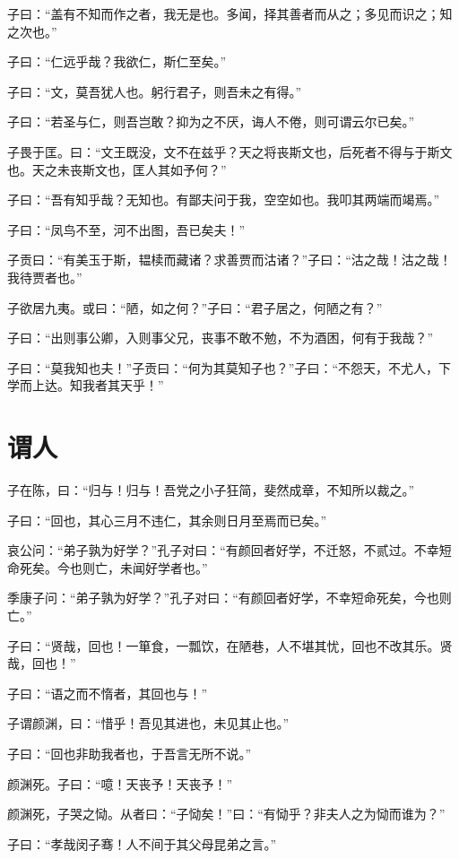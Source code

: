 \documentclass[a5paper]{ctexbook}
\begin{document}
    子曰：“盖有不知而作之者，我无是也。多闻，择其善者而从之；多见而识之；知之次也。”

    子曰：“仁远乎哉？我欲仁，斯仁至矣。”

    子曰：“文，莫吾犹人也。躬行君子，则吾未之有得。”

    子曰：“若圣与仁，则吾岂敢？抑为之不厌，诲人不倦，则可谓云尔已矣。”

    子畏于匡。曰：“文王既没，文不在兹乎？天之将丧斯文也，后死者不得与于斯文也。天之未丧斯文也，匡人其如予何？”

    子曰：“吾有知乎哉？无知也。有鄙夫问于我，空空如也。我叩其两端而竭焉。”

    子曰：“凤鸟不至，河不出图，吾已矣夫！”

    子贡曰：“有美玉于斯，韫椟而藏诸？求善贾而沽诸？”子曰：“沽之哉！沽之哉！我待贾者也。”

    子欲居九夷。或曰：“陋，如之何？”子曰：“君子居之，何陋之有？”

    子曰：“出则事公卿，入则事父兄，丧事不敢不勉，不为酒困，何有于我哉？”

    子曰：“莫我知也夫！”子贡曰：“何为其莫知子也？”子曰：“不怨天，不尤人，下学而上达。知我者其天乎！”

    \chapter{谓人}

    子在陈，曰：“归与！归与！吾党之小子狂简，斐然成章，不知所以裁之。”

    子曰：“回也，其心三月不违仁，其余则日月至焉而已矣。”

    哀公问：“弟子孰为好学？”孔子对曰：“有颜回者好学，不迁怒，不贰过。不幸短命死矣。今也则亡，未闻好学者也。”

    季康子问：“弟子孰为好学？”孔子对曰：“有颜回者好学，不幸短命死矣，今也则亡。”

    子曰：“贤哉，回也！一箪食，一瓢饮，在陋巷，人不堪其忧，回也不改其乐。贤哉，回也！”

    子曰：“语之而不惰者，其回也与！”

    子谓颜渊，曰：“惜乎！吾见其进也，未见其止也。”

    子曰：“回也非助我者也，于吾言无所不说。”

    颜渊死。子曰：“噫！天丧予！天丧予！”

    颜渊死，子哭之恸。从者曰：“子恸矣！”曰：“有恸乎？非夫人之为恸而谁为？”

    子曰：“孝哉闵子骞！人不间于其父母昆弟之言。”
\end{document}
